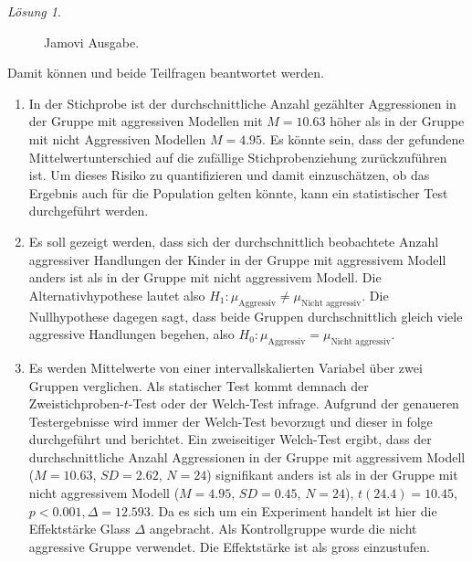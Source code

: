 \documentclass[
]{book}
\providecommand{\tightlist}{%
  \setlength{\itemsep}{0pt}\setlength{\parskip}{0pt}}
\theoremstyle{definition}
\theoremstyle{definition}
\theoremstyle{definition}
\theoremstyle{definition}
\theoremstyle{remark}
\newtheorem*{solution}{Lösung}
\begin{document}
\begin{solution}
\begin{figure}
{}

\caption{Jamovi Ausgabe.}\label{fig:sol-bobo2groups-output}
\end{figure}

Damit können und beide Teilfragen beantwortet werden.

\begin{enumerate}
\def\labelenumi{\alph{enumi})}
\tightlist
\item
  In der Stichprobe ist der durchschnittliche Anzahl gezählter Aggressionen in der Gruppe mit aggressiven Modellen mit \(M = 10.63\) höher als in der Gruppe mit nicht Aggressiven Modellen \(M = 4.95\). Es könnte sein, dass der gefundene Mittelwertunterschied auf die zufällige Stichprobenziehung zurückzuführen ist. Um dieses Risiko zu quantifizieren und damit einzuschätzen, ob das Ergebnis auch für die Population gelten könnte, kann ein statistischer Test durchgeführt werden.
\item
  Es soll gezeigt werden, dass sich der durchschnittlich beobachtete Anzahl aggressiver Handlungen der Kinder in der Gruppe mit aggressivem Modell anders ist als in der Gruppe mit nicht aggressivem Modell. Die Alternativhypothese lautet also \(H_1: \mu_\text{Aggressiv} \neq \mu_\text{Nicht aggressiv}\). Die Nullhypothese dagegen sagt, dass beide Gruppen durchschnittlich gleich viele aggressive Handlungen begehen, also \(H_0: \mu_\text{Aggressiv} = \mu_\text{Nicht aggressiv}\).
\item
  Es werden Mittelwerte von einer intervallskalierten Variabel über zwei Gruppen verglichen. Als statischer Test kommt demnach der Zweistichproben-\(t\)-Test oder der Welch-Test infrage. Aufgrund der genaueren Testergebnisse wird immer der Welch-Test bevorzugt und dieser in folge durchgeführt und berichtet. Ein zweiseitiger Welch-Test ergibt, dass der durchschnittliche Anzahl Aggressionen in der Gruppe mit aggressivem Modell (\(M = 10.63\), \(SD = 2.62\), \(N = 24\)) signifikant anders ist als in der Gruppe mit nicht aggressivem Modell (\(M = 4.95\), \(SD = 0.45\), \(N = 24\)), \(t(24.4) = 10.45\), \(p < 0.001, \Delta = 12.593\). Da es sich um ein Experiment handelt ist hier die Effektstärke Glass \(\Delta\) angebracht. Als Kontrollgruppe wurde die nicht aggressive Gruppe verwendet. Die Effektstärke ist als gross einzustufen.
\end{enumerate}

\end{solution}
\end{document}
